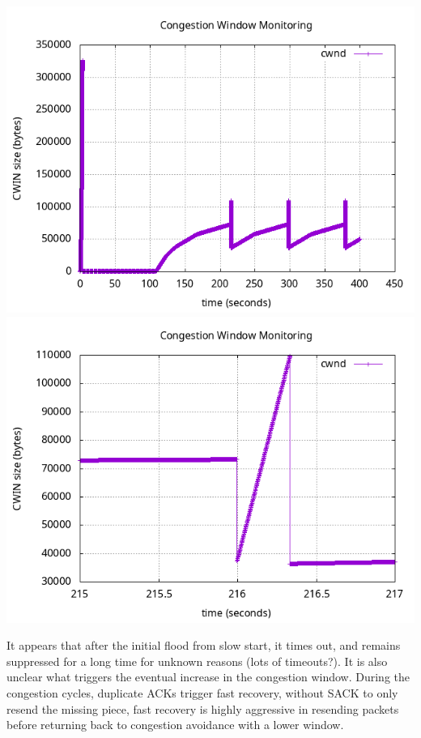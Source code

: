 \documentclass{article}
\begin{document}
\includegraphics[scale=0.5]{plots/lab1-group5-task1-experimentA-question1.3.png}
\includegraphics[scale=0.5]{plots/lab1-group5-task1-experimentA-question1.3-xrange-215-217.png}

It appears that after the initial flood from slow start, it times out, and remains suppressed for a long time for unknown reasons (lots of timeouts?). It is also unclear what triggers the eventual increase in  the congestion window.  During the congestion cycles, duplicate ACKs trigger fast recovery, without SACK to only resend the missing piece, fast recovery is highly aggressive in resending  packets before returning back to congestion avoidance with a lower window.
\end{document}
